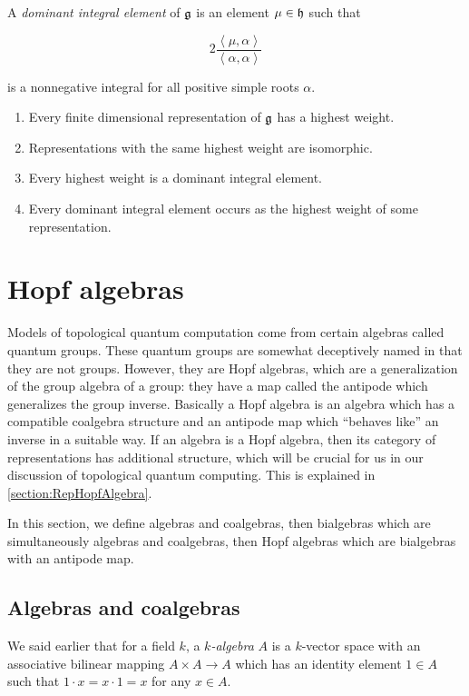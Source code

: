 \begin{defn}
A \emph{dominant integral element} of $\mathfrak{g}$ is an element $\mu \in \mathfrak{h}$ such that

\begin{equation}
2 \frac{\left<\mu,\alpha\right>}{\left<\alpha,\alpha\right>}
\end{equation}

is a nonnegative integral for all positive simple roots $\alpha$.
\end{defn}
\begin{theorem}
\begin{enumerate}
\item Every finite dimensional representation of $\mathfrak{g}$ has a highest weight.
\item Representations with the same highest weight are isomorphic.
\item Every highest weight is a dominant integral element.
\item Every dominant integral element occurs as the highest weight of some representation.
\end{enumerate}
\end{theorem}





\section{Hopf algebras}

Models of topological quantum computation come from certain algebras called
quantum groups. These quantum groups are somewhat deceptively named in that
they are not groups. However, they are Hopf algebras, which  are a
generalization of the group algebra of a group: they have a map called the
antipode which generalizes the group inverse. Basically a Hopf algebra is an
algebra which has a compatible coalgebra structure and an antipode map which
``behaves like'' an inverse in a suitable way. If an algebra is a Hopf algebra,
then its category of representations has additional structure, which will
be crucial for us in our discussion of topological quantum computing. This is
explained in \ref{section:RepHopfAlgebra}. 

In this section, we define algebras and coalgebras, then bialgebras which are
simultaneously algebras and coalgebras, then Hopf algebras which are bialgebras
with an antipode map.

\subsection{Algebras and coalgebras}
We said earlier that for a field $k$, a \emph{$k$-algebra} $A$ is a $k$-vector
space with an
associative bilinear mapping $A \times A \to A$ which has an identity element
$1 \in A$ such that $1\cdot x = x\cdot 1 = x$ for any $x \in A$.

